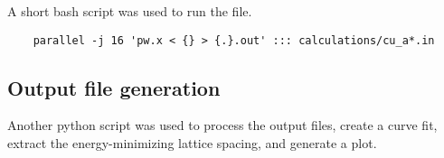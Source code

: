 A short bash script was used to run the file.

\begin{tcolorbox}[colback=gray!10, colframe=gray!30, boxrule=0.5pt, breakable]
\begin{center}
    \begin{verbatim}
    parallel -j 16 'pw.x < {} > {.}.out' ::: calculations/cu_a*.in
  \end{verbatim}
\end{center}
\end{tcolorbox}

\subsection{Output file generation}

Another python script was used to process the output files, create a
curve fit, extract the energy-minimizing lattice spacing, and generate
a plot.

\begin{tcolorbox}[colback=gray!10, colframe=gray!30, boxrule=0.5pt, breakable]
\begin{center}
  \inputminted[linenos,
  numbersep=8pt, fontsize=\small]{python}{./calculations/analyze_results.py}
\end{center}
\end{tcolorbox}


